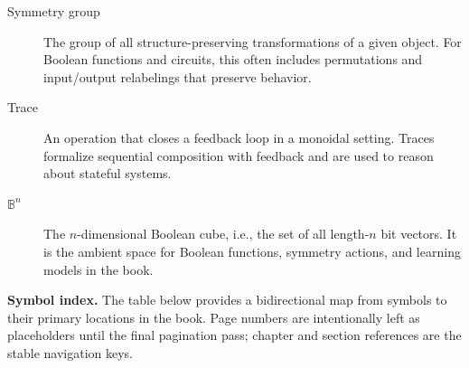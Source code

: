 \documentclass[11pt]{article}
\begin{document}
\begin{description}
  \item[Symmetry group] The group of all structure-preserving transformations of a given object. For Boolean functions and circuits, this often includes permutations and input/output relabelings that preserve behavior.

  \item[Trace] An operation that closes a feedback loop in a monoidal setting. Traces formalize sequential composition with feedback and are used to reason about stateful systems.

  \item[\(\mathbb{B}^n\)] The \(n\)-dimensional Boolean cube, i.e., the set of all length-\(n\) bit vectors. It is the ambient space for Boolean functions, symmetry actions, and learning models in the book.
\end{description}

\medskip

\noindent\textbf{Symbol index.} The table below provides a bidirectional map from symbols to their primary locations in the book. Page numbers are intentionally left as placeholders until the final pagination pass; chapter and section references are the stable navigation keys.
\end{document}
